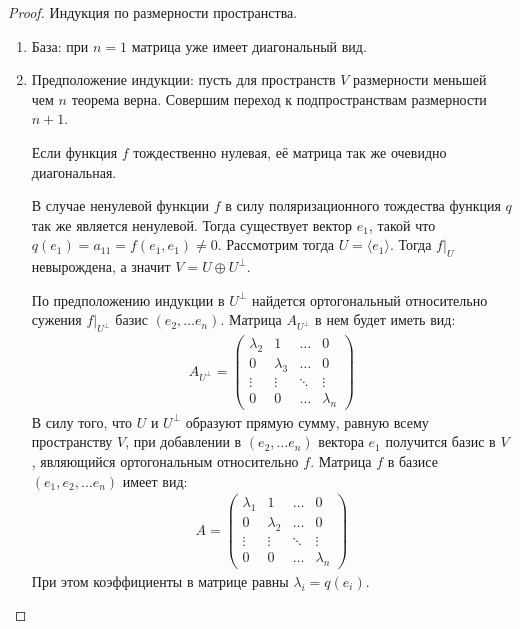 \begin{proof}
    Индукция по размерности пространства.
    \begin{enumerate}
        \item База: при $n=1$ матрица уже имеет диагональный вид.
        \item Предположение индукции: пусть для пространств $V$ размерности меньшей чем $n$ 
        теорема верна. Совершим переход к подпространствам размерности $n+1$.

        Если функция $f$ тождественно нулевая, её матрица так же очевидно диагональная.

        В случае ненулевой функции $f$ в силу поляризационного тождества функция $q$ так же является 
        ненулевой. Тогда существует вектор $e_1$, такой что $q(e_1) = a_{11} = f(e_1, e_1) \neq 0$. 
        Рассмотрим тогда $U = \langle e_1 \rangle$. Тогда $f \vert_{U}$ невырождена, а значит 
        $V = U \oplus U^{\perp}$. 

        По предположению индукции в $U^{\perp}$ найдется ортогональный относительно сужения 
        $f \vert_{U^{\perp}}$ базис $(e_2, \dots e_n)$. Матрица $A_{U^{\perp}}$ в нем будет иметь вид:
        \begin{gather*}
            A_{U^{\perp}} = \begin{pmatrix}
                \lambda_2  & 1         & \dots  & 0         \\
                0          & \lambda_3 & \dots  & 0         \\
                \vdots     & \vdots    & \ddots & \vdots    \\
                0          & 0         & \dots  & \lambda_n
            \end{pmatrix}
        \end{gather*}
        В силу того, что $U$ и $U^{\perp}$ образуют прямую сумму, равную всему пространству $V$,
        при добавлении в $(e_2, \dots e_n)$ вектора $e_1$ получится базис в $V$, 
        являющийся ортогональным относительно $f$. Матрица $f$ в базисе $(e_1, e_2, \dots e_n)$ имеет 
        вид:
        \begin{gather*}
            A = \begin{pmatrix}
                \lambda_1  & 1         & \dots  & 0         \\
                0          & \lambda_2 & \dots  & 0         \\
                \vdots     & \vdots    & \ddots & \vdots    \\
                0          & 0         & \dots  & \lambda_n
            \end{pmatrix}
        \end{gather*}
        При этом коэффициенты в матрице равны $\lambda_i = q(e_i)$.
    \end{enumerate}
\end{proof}

